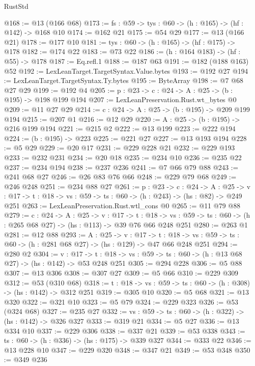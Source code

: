 \begin{lexlean}{RustStd}
\begin{coremodule}
@168 := @13 (@166 @68)
@173 := {fs : @59} -> {tys : @60} -> (h : @165) -> (hf : @142) -> @168 @10
@174 := @162 @21
@175 := @54 @29
@177 := @13 (@166 @21)
@178 := @177 @10
@181 := {tys : @60} -> (h : @165) -> (hf : @175) -> @178
@182 := @174 @22
@183 := @73 @22
@186 := (h : @164 @183) -> (hf : @55) -> @178
@187 := Eq.refl.{1}
@188 := @187 @63
@191 := @182 (@188 @163) @52
@192 := LexLeanTarget.TargetSyntax.Value.bytes
@193 := @192 @27
@194 := LexLeanTarget.TargetSyntax.Ty.bytes
@195 := ByteArray
@198 := @7 @68 @27 @29
@199 := @192 @4
@205 := {p : @23} -> {c : @24} -> {A : @25} -> (b : @195) -> @198 @199 @194
@207 := LexLeanPreservation.Rust.wt_bytes @0
@209 := @11 @27 @29
@214 := {c : @24} -> {A : @25} -> (b : @195) -> @209 @199 @194
@215 := @207 @1
@216 := @12 @29
@220 := {A : @25} -> (b : @195) -> @216 @199 @194
@221 := @215 @2
@222 := @13 @199
@223 := @222 @194
@224 := (b : @195) -> @223
@225 := @221 @27
@227 := @13 @193 @194
@228 := @5 @29
@229 := @20 @17
@231 := @229 @228 @21
@232 := @229 @193
@233 := @232 @231
@234 := @20 @18
@235 := @234 @10
@236 := @235 @22
@237 := @234 @194
@238 := @237 @236
@241 := @7 @66 @79 @88
@243 := @241 @68 @27
@246 := @26 @83 @76 @66
@248 := @229 @79 @68
@249 := @246 @248
@251 := @234 @88 @27
@261 := {p : @23} ->
  {c : @24} ->
  {A : @25} ->
  {v : @17} -> {t : @18} -> {vs : @59} -> {ts : @60} -> (h : @243) -> (hs : @82) -> @249 @251
@263 := LexLeanPreservation.Rust.wtl_cons @0
@265 := @11 @79 @88
@279 := {c : @24} ->
  {A : @25} ->
  {v : @17} ->
  {t : @18} ->
  {vs : @59} -> {ts : @60} -> (h : @265 @68 @27) -> (hs : @113) -> @39 @76 @66 @248 @251
@280 := @263 @1
@281 := @12 @88
@293 := {A : @25} ->
  {v : @17} ->
  {t : @18} -> {vs : @59} -> {ts : @60} -> (h : @281 @68 @27) -> (hs : @129) -> @47 @66 @248 @251
@294 := @280 @2
@304 := {v : @17} ->
  {t : @18} -> {vs : @59} -> {ts : @60} -> (h : @13 @68 @27) -> (hs : @142) -> @53 @248 @251
@305 := @294 @228
@306 := @5 @88
@307 := @13 @306
@308 := @307 @27
@309 := @5 @66
@310 := @229 @309
@312 := @53 (@310 @68)
@318 := {t : @18} -> {vs : @59} -> {ts : @60} -> (h : @308) -> (hs : @142) -> @312 @251
@319 := @305 @10
@320 := @5 @68
@321 := @13 @320
@322 := @321 @10
@323 := @5 @79
@324 := @229 @323
@326 := @53 (@324 @68)
@327 := @235 @27
@332 := {vs : @59} -> {ts : @60} -> (h : @322) -> (hs : @142) -> @326 @327
@333 := @319 @21
@334 := @5 @27
@336 := @13 @334 @10
@337 := @229 @306
@338 := @337 @21
@339 := @53 @338
@343 := {ts : @60} -> (h : @336) -> (hs : @175) -> @339 @327
@344 := @333 @22
@346 := @13 @228 @10
@347 := @229 @320
@348 := @347 @21
@349 := @53 @348
@350 := @349 @236

\end{coremodule}
\end{lexlean}
